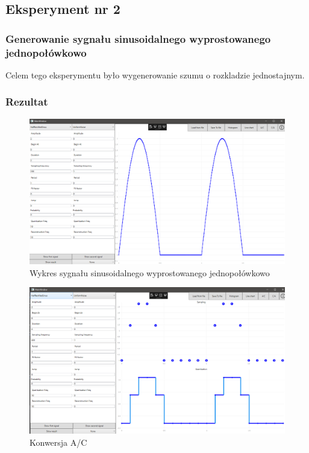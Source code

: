 \documentclass[12pt]{article}
\begin{document}


\subsection{Eksperyment nr 2 }
\subsubsection{Generowanie sygnału sinusoidalnego wyprostowanego jednopołówkowo}
Celem tego eksperymentu było wygenerowanie szumu o rozkladzie jednostajnym.


\subsubsection{Rezultat}

\begin{figure}[H]
 \centering
 \includegraphics[width=14cm]{images/hsinline.PNG}
 \vspace{-0.3cm}
 \caption{Wykres sygnału sinusoidalnego wyprostowanego jednopołówkowo}
 \label{gui}
\end{figure}

\begin{figure}[H]
 \centering
 \includegraphics[width=14cm]{images/hsinac.PNG}
 \vspace{-0.3cm}
 \caption{Konwersja A/C}
 \label{gui}
\end{figure}
\end{document}
